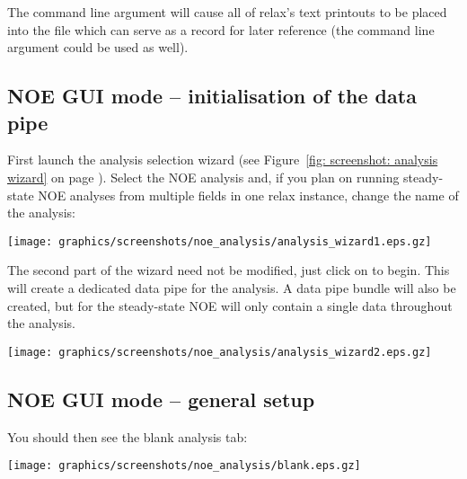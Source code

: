 
The  command line argument will cause all of relax's text printouts to be placed into the  file which can serve as a record for later reference (the  command line argument could be used as well).



\subsection{NOE GUI mode -- initialisation of the data pipe}

First launch the analysis selection wizard (see Figure~\ref{fig: screenshot: analysis wizard} on page \pageref{fig: screenshot: analysis wizard}).  Select the NOE analysis and, if you plan on running steady-state NOE analyses from multiple fields in one relax instance, change the name of the analysis:

\begin{minipage}[h]{\linewidth}
\centerline{\texttt{[image: graphics/screenshots/noe\_analysis/analysis\_wizard1.eps.gz]}}
\end{minipage}

The second part of the wizard need not be modified, just click on  to begin.  This will create a dedicated data pipe for the analysis.  A data pipe bundle will also be created, but for the steady-state NOE will only contain a single data throughout the analysis.

\begin{minipage}[h]{\linewidth}
\centerline{\texttt{[image: graphics/screenshots/noe\_analysis/analysis\_wizard2.eps.gz]}}
\end{minipage}



\subsection{NOE GUI mode -- general setup}

You should then see the blank analysis tab:

\begin{minipage}[h]{\linewidth}
\centerline{\texttt{[image: graphics/screenshots/noe\_analysis/blank.eps.gz]}}
\end{minipage}

